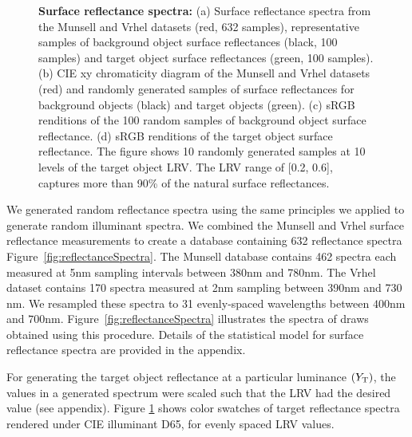 \documentclass{jov}
\begin{document}
\begin{figure}
\begin{subfigure}{0.24 \textwidth}
        \label{fig:targetSwatches}
    \end{subfigure}
    \caption{{\bf Surface reflectance spectra:} (a) Surface reflectance spectra from the Munsell and Vrhel datasets (red, 632 samples), representative samples of background object surface reflectances (black, 100 samples) and target object surface reflectances (green, 100 samples). (b) CIE xy chromaticity diagram of the Munsell and Vrhel datasets (red) and randomly generated samples of surface reflectances for background objects (black) and target objects (green). (c) sRGB renditions of the 100 random samples of background object surface reflectance. (d) sRGB renditions of the target object surface reflectance. The figure shows 10 randomly generated samples at 10 levels of the target object LRV. The LRV range of [0.2, 0.6], captures more than 90\% of the natural surface reflectances.}
\label{fig:surfaceReflectanceGeneration}
\end{figure}

We generated random reflectance spectra using the same principles we applied to generate random illuminant spectra.
We combined the Munsell \cite{kelly1943tristimulus} and Vrhel \cite{vrhel1994measurement} surface reflectance 
measurements to create a database containing 632 reflectance spectra Figure~\ref{fig:reflectanceSpectra}.
The Munsell database contains 462 spectra each measured at 5nm sampling intervals between 380nm and 780nm.
The Vrhel dataset contains 170 spectra measured at 2nm sampling between 390nm and 730 nm.
We resampled these spectra to 31 evenly-spaced wavelengths between $400$nm and $700$nm.
Figure~\ref{fig:reflectanceSpectra} illustrates the spectra of draws obtained using this procedure.
Details of the statistical model for surface reflectance spectra are provided in the appendix. 

For generating the target object reflectance at a particular luminance $(Y_{\rm T})$, the values in a generated spectrum were 
scaled such that the LRV had the desired value (see appendix).
Figure \ref{fig:targetSwatches} shows color swatches of target reflectance spectra rendered under CIE illuminant D65, for evenly spaced LRV values.
\end{document}
